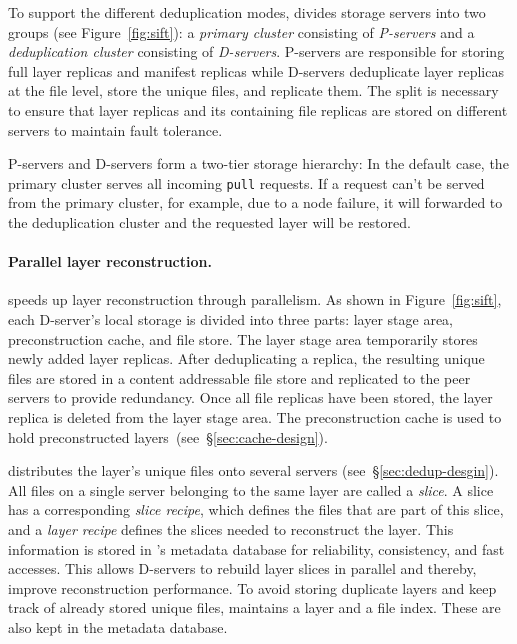 To support the different deduplication modes, \sysname divides storage servers
into two groups (see Figure~\ref{fig:sift}): a \emph{primary cluster}
consisting of \emph{P-servers} and a \emph{deduplication cluster} consisting of
\emph{D-servers}.
%
P-servers are responsible for storing full layer replicas and manifest replicas
while D-servers deduplicate layer replicas at the file level, store the unique
files, and replicate them.
%
The split is necessary to ensure that layer replicas and its containing file
replicas are stored on different servers to maintain fault tolerance.


P-servers and D-servers form a two-tier storage hierarchy: In the default case,
the primary cluster serves all incoming \texttt{pull} requests.
%
If a request can't be served from the primary cluster, for example, due to a
node failure, it will forwarded to the deduplication cluster and the requested
layer will be restored.
%
%





\paragraph{Parallel layer reconstruction.}
%
\sysname speeds up layer reconstruction through parallelism.
%
As shown in Figure~\ref{fig:sift}, each D-server's local storage is divided
into three parts: layer stage area, preconstruction cache, and file store.
%
The layer stage area temporarily stores newly added layer replicas.
%
After deduplicating a replica, the resulting unique files are stored in a
content addressable file store and replicated to the peer servers to provide
redundancy. Once all file replicas have been stored, the layer replica is deleted
from the layer stage area.%
%
The preconstruction cache is used to hold preconstructed
layers~(see~\S\ref{sec:cache-design}).

\sysname distributes the layer's unique files onto several servers
(see~\S\ref{sec:dedup-desgin}).
%
All files on a single server belonging to the same layer are called a
\emph{slice}.
%
A slice has a corresponding \emph{slice recipe}, which defines the files that
are part of this slice, and a \emph{layer recipe} defines the slices needed to
reconstruct the layer.
%
This information is stored in \sysname{}'s metadata database for reliability,
consistency, and fast accesses. 
%
This allows D-servers to rebuild layer slices in parallel and thereby, improve
reconstruction performance.
%
To avoid storing duplicate layers and keep track of already stored unique
files, \sysname maintains a layer and a file index. These are also kept in the
metadata database.




